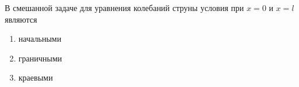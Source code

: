 В смешанной задаче для уравнения колебаний струны условия при \(x = 0\) и \(x = l\) являются

\begin{enumerate}[label=\arabic*)]
    \item начальными
    \item граничными
    \item краевыми
\end{enumerate}

